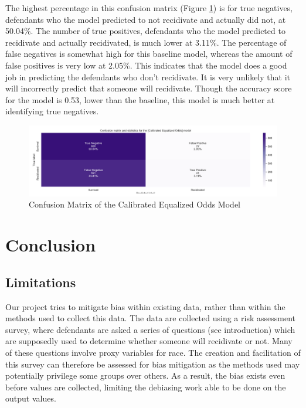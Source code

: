 \documentclass[water,article,submit,moreauthors,pdftex]{mdpi}
\begin{document}
The highest percentage in this confusion matrix (Figure
\ref{fig:ceo matrix}) is for true negatives, defendants who the model
predicted to not recidivate and actually did not, at 50.04\%. The number
of true positives, defendants who the model predicted to recidivate and
actually recidivated, is much lower at 3.11\%. The percentage of false
negatives is somewhat high for this baseline model, whereas the amount
of false positives is very low at 2.05\%. This indicates that the model
does a good job in predicting the defendants who don't recidivate. It is
very unlikely that it will incorrectly predict that someone will
recidivate. Though the accuracy score for the model is 0.53, lower than
the baseline, this model is much better at identifying true negatives.

\begin{figure}

{\centering \includegraphics[width=1\linewidth]{../images/ceo_matrix} 

}

\caption{Confusion Matrix of the Calibrated Equalized Odds Model}\label{fig:ceo matrix}
\end{figure}

\hypertarget{conclusion}{%
\section{Conclusion}\label{conclusion}}

\hypertarget{limitations}{%
\subsection{Limitations}\label{limitations}}

Our project tries to mitigate bias within existing data, rather than
within the methods used to collect this data. The data are collected
using a risk assessment survey, where defendants are asked a series of
questions (see introduction) which are supposedly used to determine
whether someone will recidivate or not. Many of these questions involve
proxy variables for race. The creation and facilitation of this survey
can therefore be assessed for bias mitigation as the methods used may
potentially privilege some groups over others. As a result, the bias
exists even before values are collected, limiting the debiasing work
able to be done on the output values.
\end{document}
